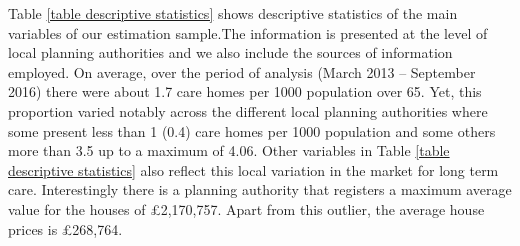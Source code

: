 \documentclass[12pt,letterpaper]{article}
\begin{document}
 \begin{table}[ht]
\centering
\caption{Descriptive statistics}
\label{table descriptive statistics}
\end{table}
    
 Table \ref{table descriptive statistics} shows descriptive statistics of the 
 main variables of our estimation sample.The information is presented at the level of local planning 
 authorities and we also include the sources of information employed. 
 On average, over the period of analysis (March 2013 – September 2016) 
 there were about 1.7 care homes per 1000 population over 65. 
 Yet, this proportion varied notably across the different local planning authorities 
 where some present less than 1 (0.4) care homes per 1000 population
  and some others more than 3.5 up to a maximum of 4.06. Other variables in Table \ref{table descriptive statistics} 
  also reflect this local variation in the market for long term care. 
  Interestingly there is a planning authority that registers a maximum
   average value for the houses of £2,170,757. Apart from this outlier, the average house prices is £268,764.
 
\end{document}
